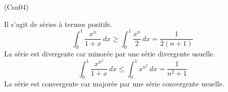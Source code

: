 \begin{tiny}(Csn04)\end{tiny} Il s'agit de séries à termes positifs.
\begin{displaymath}
 \int_0^1 \frac{x^n}{1+x}\,dx \geq \int_0^1 \frac{x^n}{2}\,dx = \frac{1}{2(n+1)} 
\end{displaymath}
La série est divergente car minorée par une série divergente usuelle.
\begin{displaymath}
 \int_0^1 \frac{x^{n^2}}{1+x}\,dx \leq \int_0^1 x^{n^2}\,dx = \frac{1}{n^2+1} 
\end{displaymath}
La série est convergente car majorée par une série convergente usuelle.